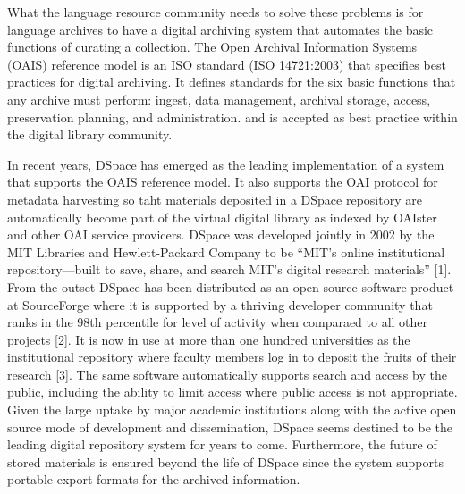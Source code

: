 
What the language resource community needs to solve these problems
is for language archives to have a digital archiving system that
automates the basic functions of curating a collection.  The Open Archival Information Systems (OAIS) reference model \citep{OAIS02} is an ISO standard (ISO 14721:2003) that specifies best practices for digital archiving.  It defines standards for the six basic functions that 
any archive must perform: ingest, data management, archival
storage, access, preservation planning, and administration. and is accepted as best practice within the digital library community.

In recent years, DSpace has emerged as the leading implementation of
a system that supports the OAIS reference model.  It also supports
the OAI protocol for metadata harvesting so taht materials deposited
in a DSpace repository are automatically become part of the virtual
digital library as indexed by OAIster and other OAI service provicers.
DSpace was developed 
jointly in 2002 by the MIT Libraries and Hewlett-Packard Company to be
``MIT's online institutional repository---built to save, share, and search MIT's digital research materials'' [1]. From the outset
DSpace has been distributed as an open source software product at SourceForge where it is supported by a thriving developer community
that ranks in the 98th percentile for level of activity when 
comparaed to all other projects [2].  It is now in use at more than one hundred universities as the institutional repository where faculty 
members log in to deposit the fruits of their research  [3]. 
The same software automatically supports search and access by the public,
including the ability to limit access where public access is not 
appropriate.  Given the large uptake by
major academic institutions along with the active open source mode of
development and dissemination, DSpace seems destined to be the leading
digital repository system for years to come. Furthermore, the future of
stored materials is ensured beyond the life of DSpace since the system
supports portable export formats for the archived information.



